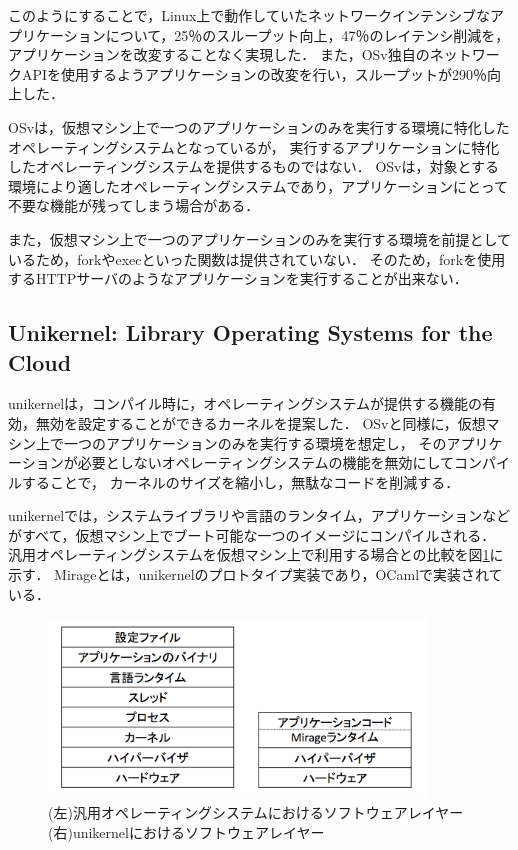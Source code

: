 \documentclass[graduation-thesis]{mlarticle}
\begin{document}
このようにすることで，Linux上で動作していたネットワークインテンシブなアプリケーションについて，25％のスループット向上，47％のレイテンシ削減を，アプリケーションを改変することなく実現した．
また，OSv独自のネットワークAPIを使用するようアプリケーションの改変を行い，スループットが290％向上した．

OSvは，仮想マシン上で一つのアプリケーションのみを実行する環境に特化したオペレーティングシステムとなっているが，
実行するアプリケーションに特化したオペレーティングシステムを提供するものではない．
OSvは，対象とする環境により適したオペレーティングシステムであり，アプリケーションにとって不要な機能が残ってしまう場合がある．

また，仮想マシン上で一つのアプリケーションのみを実行する環境を前提としているため，forkやexecといった関数は提供されていない．
そのため，forkを使用するHTTPサーバのようなアプリケーションを実行することが出来ない．

\subsection {Unikernel: Library Operating Systems for the Cloud}
\label{relative:unikernel}
unikernelは，コンパイル時に，オペレーティングシステムが提供する機能の有効，無効を設定することができるカーネルを提案した．
OSvと同様に，仮想マシン上で一つのアプリケーションのみを実行する環境を想定し，
そのアプリケーションが必要としないオペレーティングシステムの機能を無効にしてコンパイルすることで，
カーネルのサイズを縮小し，無駄なコードを削減する．

unikernelでは，システムライブラリや言語のランタイム，アプリケーションなどがすべて，仮想マシン上でブート可能な一つのイメージにコンパイルされる．
汎用オペレーティングシステムを仮想マシン上で利用する場合との比較を図\ref{fig:unikernel}に示す．
Mirageとは，unikernelのプロトタイプ実装であり，OCamlで実装されている．

\begin{figure}[H]
  \begin{center}
    \includegraphics[width=10.0cm]{images/unikernel.png}
    \caption{(左)汎用オペレーティングシステムにおけるソフトウェアレイヤー (右)unikernelにおけるソフトウェアレイヤー}
    \label{fig:unikernel}
  \end{center}
\end{figure}
\end{document}
